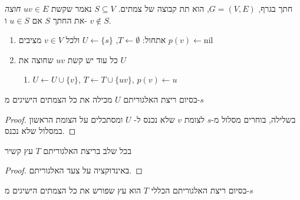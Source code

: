 \begin{definition}[חתך]
חתך בגרף,
$G = (V, E)$,
הוא תת קבוצה של צמתים. 
$S \subseteq V$
נאמר שקשת 
$uv \in E$
\emph{חוצה}
את החתך $S$ אם
$u \in S$
ו-%
$v \notin S$.
\end{definition}
\begin{enumerate}
\item 
אתחול:
$T \leftarrow \emptyset$, 
$U \leftarrow \{s\}$
ולכל 
$v \in V$
מציבים 
$p(v) \leftarrow \text{nil}$
\item
כל עוד יש קשת
$uv$
שחוצה את $U$
	\begin{enumerate}
	\item
	$U \leftarrow U \cup \{v\}$,
	$T \leftarrow T \cup \{uv\}$,
	$p(v) \leftarrow u$
	\end{enumerate}
\end{enumerate}

\begin{claim}
בסיום ריצת האלגוריתם
$U$
מכילה את כל הצמתים הישיגים מ-$s$
\end{claim}
\begin{proof}
בשלילה, בוחרים מסלול מ-$s$ לצומת $v$ שלא נכנס ל-%
$U$
ומסתכלים על הצומת הראשון במסלול שלא נכנס.
\end{proof}
\begin{claim}
בכל שלב בריצת האלגוריתם
$T$
עץ קשיר
\end{claim}
\begin{proof}
באינדוקציה על צעד האלגוריתם.
\end{proof}
\begin{theorem}
בסיום ריצת האלגוריתם הכללי $T$ הוא עץ שפורש את כל הצמתים הישיגים מ-$s$
\end{theorem}





